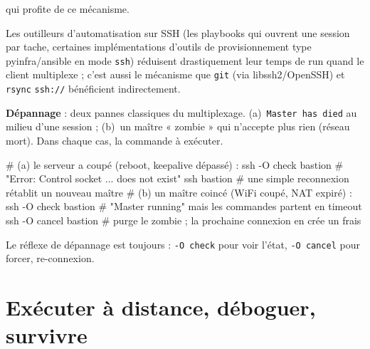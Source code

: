 \documentclass[a4paper,10pt]{exam}
\begin{document}
\begin{questions}
qui profite de ce mécanisme.
\begin{solution}
Les outilleurs d'automatisation sur SSH (les playbooks qui ouvrent une session par tache,
certaines implémentations d'outils de provisionnement type pyinfra/ansible en mode
\texttt{ssh}) réduisent drastiquement leur temps de run quand le client multiplexe ;
c'est aussi le mécanisme que \texttt{git} (via libssh2/OpenSSH) et \texttt{rsync}
\texttt{ssh://} bénéficient indirectement.
\end{solution}
\question \textbf{Dépannage} : deux pannes classiques du multiplexage.
(a)~\texttt{Master has died} au milieu d'une session ; (b)~un maître « zombie » qui
n'accepte plus rien (réseau mort). Dans chaque cas, la commande à exécuter.
\begin{solution}
\begin{bashcode}
# (a) le serveur a coupé (reboot, keepalive dépassé) :
ssh -O check bastion     # "Error: Control socket ... does not exist"
ssh bastion              # une simple reconnexion rétablit un nouveau maître
# (b) un maître coincé (WiFi coupé, NAT expiré) :
ssh -O check bastion     # "Master running" mais les commandes partent en timeout
ssh -O cancel bastion    # purge le zombie ; la prochaine connexion en crée un frais
\end{bashcode}
Le réflexe de dépannage est toujours : \texttt{-O check} pour voir l'état,
\texttt{-O cancel} pour forcer, re-connexion.
\end{solution}
\end{questions}

\section{Exécuter à distance, déboguer, survivre}
\end{document}
